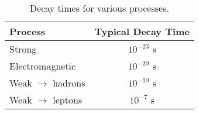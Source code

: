 \begin{table}[!b]
\caption{Decay times for various processes.}
\label{table:process_decay_times}
\begin{center}
\begin{tabular}[tbp]{lc}
Process & Typical Decay Time  \\[0.5ex]
\hline\hline
Strong             & $10^{-23}$ s \\[0.5ex]
Electromagnetic    & $10^{-20}$ s \\[0.5ex]
Weak $\to$ hadrons & $10^{-10}$ s \\[0.5ex]
Weak $\to$ leptons & $10^{-7}$ s  \\[0.5ex]
\hline
\end{tabular}
\end{center}
\end{table}

